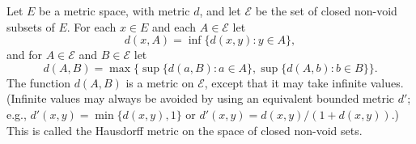 Let $E$ be a metric space, with metric $d$, and let $\mathcal{E}$ be the set of closed non-void subsets of $E$. For each $x \in E$ and each $A \in \mathcal{E}$ let
$$d(x, A) = \inf \{d(x, y) : y \in A\},$$
and for $A \in \mathcal{E}$ and $B \in \mathcal{E}$ let
$$d(A, B) = \max \{\sup \{d(a, B) : a \in A\}, \sup \{d(A, b) : b \in B\}\}.$$
The function $d(A, B)$ is a metric on $\mathcal{E}$, except that it may take infinite values. (Infinite values may always be avoided by using an equivalent bounded metric $d'$; e.g., $d'(x, y) = \min \{d(x, y), 1\}$ or $d'(x, y) = d(x, y) / (1 + d(x, y))$.) This is called the Hausdorff metric on the space of closed non-void sets.
